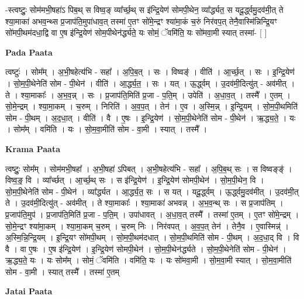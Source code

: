\documentclass[17pt]{extarticle}
\begin{document}
-स्त्वष्टुः॒ सोम॑मभी॒षहा॑ऽ पिब॒थ् स विष्व॒ङ् व्या᳚र्च्छ॒थ् स इ॑न्द्रि॒येण॑ सोमपी॒थेन॒ व्या᳚र्द्ध्यत॒ स यदू॒र्द्ध्वमु॒दव॑मी॒त् ते श्या॒माका॑ अभव॒न्थ्स प्र॒जाप॑ति॒मुपा॑धाव॒त् तस्मा॑ ए॒तꣳ सो॑मे॒न्द्रꣳ श्या॑मा॒कं च॒रुं निर॑वप॒त् तेनै॒वास्मि॑न्निन्द्रि॒यꣳ सो॑मपी॒थम॑दधा॒द्वि वा ए॒ष इ॑न्द्रि॒येण॑ सोम॒पीथेन॑र्द्ध्यते॒ यः सोमं॒ ॅवमि॑ति॒ यः सो॑मवा॒मी स्यात् तस्मा॑-  [  ] \newline

\textbf{Pada Paata} \newline

त्वष्टुः॑ । सोम᳚म् । अ॒भी॒षहेत्य॑भि - सहा᳚ । अ॒पि॒ब॒त् । सः । विष्वङ्॑ । वीति॑ । आ॒र्च्छ॒त् । सः । इ॒न्द्रि॒येण॑ । सो॒म॒पी॒थेनेति॑ सोम - पी॒थेन॑ । वीति॑ । आ॒र्द्ध्य॒त॒ । सः । यत् । ऊ॒र्द्ध्वम् । उ॒दव॑मी॒दित्यु॑त् - अव॑मीत् । ते । श्या॒माकाः᳚ । अ॒भ॒व॒न्न् । सः । प्र॒जाप॑ति॒मिति॑ प्र॒जा - प॒ति॒म् । उपेति॑ । अ॒धा॒व॒त् । तस्मै᳚ । ए॒तम् । सो॒मे॒न्द्रम् । श्या॒मा॒कम् । च॒रुम् । निरिति॑ । अ॒व॒प॒त् । तेन॑ । ए॒व । अ॒स्मि॒न्न् । इ॒न्द्रि॒यम् । सो॒म॒पी॒थमिति॑ सोम - पी॒थम् । अ॒द॒धा॒त् । वीति॑ । वै । ए॒षः । इ॒न्द्रि॒येण॑ । सो॒म॒पी॒थेनेति॑ सोम - पी॒थेन॑ । ऋ॒द्ध्य॒ते॒ । यः । सोम᳚म् । वमि॑ति । यः । सो॒म॒वा॒मीति॑ सोम - वा॒मी । स्यात् । तस्मै᳚ ।  \newline


\textbf{Krama Paata} \newline

त्वष्टुः॒ सोम᳚म् । सोम॑मभी॒षहा᳚ । अ॒भी॒षहा॑ ऽपिबत् । अ॒भी॒षहेत्य॑भि - सहा᳚ । अ॒पि॒ब॒थ् सः । स विष्वङ्ङ्॑ । विष्व॒ङ्॒ वि । व्या᳚र्च्छत् । आ॒र्च्छ॒थ् सः । स इ॑न्द्रि॒येण॑ । इ॒न्द्रि॒येण॑ सोमपी॒थेन॑ । सो॒म॒पी॒थेन॒ वि । सो॒म॒पी॒थेनेति॑ सोम - पी॒थेन॑ । व्या᳚र्द्ध्यत । आ॒र्द्ध्य॒त॒ सः । स यत् । यदू॒र्द्ध्वम् । ऊ॒र्द्ध्वमु॒दव॑मीत् । उ॒दव॑मी॒त् ते । उ॒दव॑मी॒दित्यु॑त् - अव॑मीत् । ते श्या॒माकाः᳚ । श्या॒माका॑ अभवन्न् । अ॒भ॒व॒न्थ् सः । स प्र॒जाप॑तिम् । प्र॒जाप॑ति॒मुप॑ । प्र॒जाप॑ति॒मिति॑ प्र॒जा - प॒ति॒म् । उपा॑धावत् । अ॒धा॒व॒त् तस्मै᳚ । तस्मा॑ ए॒तम् । ए॒तꣳ सो॑मे॒न्द्रम् । सो॒मे॒न्द्रꣳ श्या॑मा॒कम् । श्या॒मा॒कम् च॒रुम् । च॒रुम् निः । निर॑वपत् । अ॒व॒प॒त् तेन॑ । तेनै॒व । ए॒वास्मिन्न्॑ । अ॒स्मि॒न्नि॒न्द्रि॒यम् । इ॒न्द्रि॒यꣳ सो॑मपी॒थम् । सो॒म॒पी॒थम॑दधात् । सो॒म॒पी॒थमिति॑ सोम - पी॒थम् । अ॒द॒धा॒द् वि । वि वै । वा ए॒षः । ए॒ष इ॑न्द्रि॒येण॑ । इ॒न्द्रि॒येण॑ सोमपी॒थेन॑ । सो॒म॒पी॒थेन॑र्द्ध्यते । सो॒म॒पी॒थेनेति॑ सोम - पी॒थेन॑ । ऋ॒द्ध्य॒ते॒ यः । यः सोम᳚म् । सोमं॒ ॅवमि॑ति । वमि॑ति॒ यः । यः सो॑मवा॒मी । सो॒म॒वा॒मी स्यात् । सो॒म॒वा॒मीति॑ सोम - वा॒मी । स्यात् तस्मै᳚ । तस्मा॑ ए॒तम् \newline

\textbf{Jatai Paata} \newline
\end{document}
